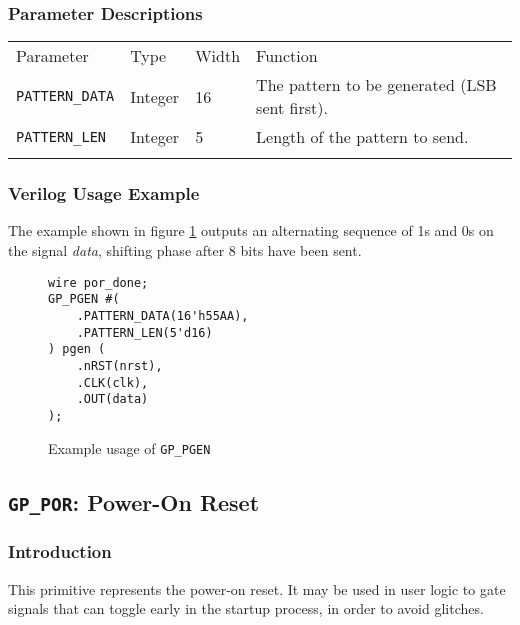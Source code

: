 \documentclass[11pt]{article}
\newcommand{\namestyle}[1]{\textit{#1}}
\newcommand{\tokenstyle}[1]{\texttt{#1}}
\newcommand{\whenstyle}[1]{{\fontseries{sb}\selectfont#1}}
\newcommand{\thinhline}{\Xhline{1\arrayrulewidth}}
\newcommand{\thickhline}{\Xhline{2.5\arrayrulewidth}}
\begin{document}
\subsubsection{Parameter Descriptions}

\begin{tabularx}{\textwidth}{lllX}
\thinhline
\whenstyle{Parameter} & \whenstyle{Type} & \whenstyle{Width} & \whenstyle{Function} \\
\thickhline
\tokenstyle{PATTERN\_DATA} & Integer & 16 & The pattern to be generated (LSB sent first). \\
\thinhline
\tokenstyle{PATTERN\_LEN} & Integer & 5 & Length of the pattern to send. \\
\thinhline
\end{tabularx}

\subsubsection{Verilog Usage Example}

The example shown in figure \ref{gp-pgen-example} outputs an alternating sequence of 1s and 0s on the signal
\namestyle{data}, shifting phase after 8 bits have been sent.

\begin{figure}[h]
\begin{lstlisting}
wire por_done;
GP_PGEN #(
	.PATTERN_DATA(16'h55AA),
	.PATTERN_LEN(5'd16)
) pgen (
	.nRST(nrst),
	.CLK(clk),
	.OUT(data)
);
\end{lstlisting}
\caption{Example usage of \tokenstyle{GP\_PGEN}}
\label{gp-pgen-example}
\end{figure}


\pagebreak
\clearpage
\subsection{\tokenstyle{GP\_POR}: Power-On Reset}
\label{gp-por}

\subsubsection{Introduction}
This primitive represents the power-on reset. It may be used in user logic to gate signals that can toggle early in the
startup process, in order to avoid glitches.
\end{document}
